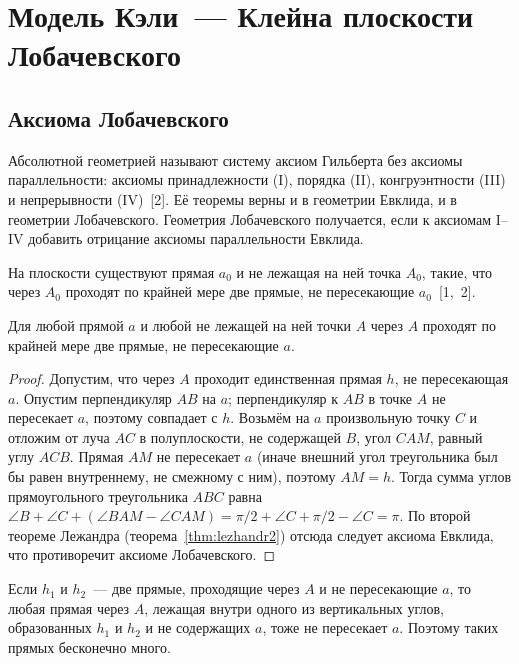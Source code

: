 \section{Модель Кэли~--- Клейна плоскости Лобачевского}

\subsection{Аксиома Лобачевского}

Абсолютной геометрией называют систему аксиом Гильберта без аксиомы параллельности: аксиомы принадлежности (I), порядка (II), конгруэнтности (III) и непрерывности (IV)~[2]. Её теоремы верны и в геометрии Евклида, и в геометрии Лобачевского. Геометрия Лобачевского получается, если к аксиомам I--IV добавить отрицание аксиомы параллельности Евклида.

\begin{definition}
На плоскости существуют прямая $a_0$ и не лежащая на ней точка $A_0$, такие, что через $A_0$ проходят по крайней мере две прямые, не пересекающие $a_0$~[1,~2].
\end{definition}

\begin{theorem}[\!\!{[1]}]\label{thm:lv-vsegda}
Для любой прямой $a$ и любой не лежащей на ней точки $A$ через $A$ проходят по крайней мере две прямые, не пересекающие $a$.
\end{theorem}
\begin{proof}
Допустим, что через $A$ проходит единственная прямая $h$, не пересекающая $a$. Опустим перпендикуляр $AB$ на $a$; перпендикуляр к $AB$ в точке $A$ не пересекает $a$, поэтому совпадает с $h$. Возьмём на $a$ произвольную точку $C$ и отложим от луча $AC$ в полуплоскости, не содержащей $B$, угол $CAM$, равный углу $ACB$. Прямая $AM$ не пересекает $a$ (иначе внешний угол треугольника был бы равен внутреннему, не смежному с ним), поэтому $AM=h$. Тогда сумма углов прямоугольного треугольника $ABC$ равна $\angle B+\angle C+(\angle BAM-\angle CAM)=\pi/2+\angle C+\pi/2-\angle C=\pi$. По второй теореме Лежандра (теорема~\ref{thm:lezhandr2}) отсюда следует аксиома Евклида, что противоречит аксиоме Лобачевского.
\end{proof}

Если $h_1$ и $h_2$~--- две прямые, проходящие через $A$ и не пересекающие $a$, то любая прямая через $A$, лежащая внутри одного из вертикальных углов, образованных $h_1$ и $h_2$ и не содержащих $a$, тоже не пересекает $a$. Поэтому таких прямых бесконечно много.

